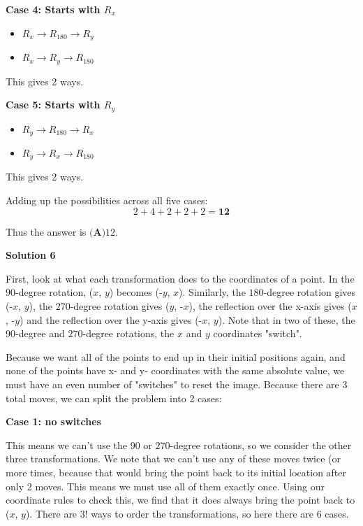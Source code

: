 \begin{enumerate}
 \textbf{Case 4: Starts with $R_x$}

 
            \begin{itemize}
        \item $R_x \to R_{180} \to R_y$
        \item $R_x \to R_y \to R_{180}$
            \end{itemize}
            This gives 2 ways.

 \textbf{Case 5: Starts with $R_y$}

 
            \begin{itemize}
        \item $R_y \to R_{180} \to R_x$
        \item $R_y \to R_x \to R_{180}$
            \end{itemize}
            This gives 2 ways.

 Adding up the possibilities across all five cases:
 \[2 + 4 + 2 + 2 + 2 = \mathbf{12}\]

 Thus the answer is $\boxed{\textbf{(A)} 12}$.

 



\textbf{Solution 6}

First, look at what each transformation does to the coordinates of a point. In the $90$-degree rotation, ($x$, $y$) becomes (-$y$, $x$). Similarly, the $180$-degree rotation gives (-$x$, $y$), the $270$-degree rotation gives ($y$, -$x$), the reflection over the x-axis gives ($x$, -$y$) and the reflection over the y-axis gives (-$x$, $y$). Note that in two of these, the $90$-degree and $270$-degree rotations, the $x$ and $y$ coordinates "switch".

 Because we want all of the points to end up in their initial positions again, and none of the points have x- and y- coordinates with the same absolute value, we must have an even number of "switches" to reset the image. Because there are 3 total moves, we can split the problem into 2 cases:

 \textbf{Case 1: no switches}

 This means we can't use the $90$ or $270$-degree rotations, so we consider the other three transformations. We note that we can't use any of these moves twice (or more times, because that would bring the point back to its initial location after only 2 moves. This means we must use all of them exactly once. Using our coordinate rules to check this, we find that it does always bring the point back to ($x$, $y$). There are 3! ways to order the transformations, so here there are 6 cases.


\end{enumerate}
